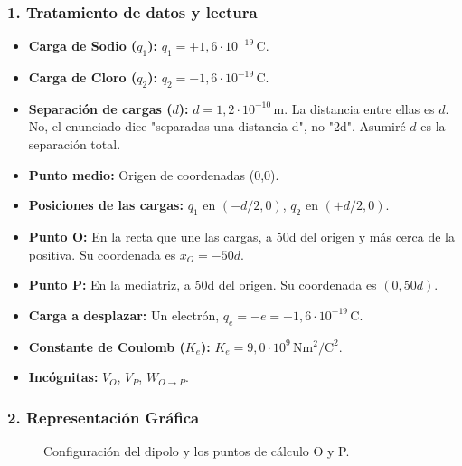 \subsubsection*{1. Tratamiento de datos y lectura}
\begin{itemize}
    \item \textbf{Carga de Sodio ($q_1$):} $q_1 = +1,6 \cdot 10^{-19} \, \text{C}$.
    \item \textbf{Carga de Cloro ($q_2$):} $q_2 = -1,6 \cdot 10^{-19} \, \text{C}$.
    \item \textbf{Separación de cargas ($d$):} $d = 1,2 \cdot 10^{-10} \, \text{m}$. La distancia entre ellas es $d$. No, el enunciado dice "separadas una distancia d", no "2d". Asumiré $d$ es la separación total.
    \item \textbf{Punto medio:} Origen de coordenadas (0,0).
    \item \textbf{Posiciones de las cargas:} $q_1$ en $(-d/2, 0)$, $q_2$ en $(+d/2, 0)$.
    \item \textbf{Punto O:} En la recta que une las cargas, a 50d del origen y más cerca de la positiva. Su coordenada es $x_O = -50d$.
    \item \textbf{Punto P:} En la mediatriz, a 50d del origen. Su coordenada es $(0, 50d)$.
    \item \textbf{Carga a desplazar:} Un electrón, $q_e = -e = -1,6 \cdot 10^{-19} \, \text{C}$.
    \item \textbf{Constante de Coulomb ($K_e$):} $K_e = 9,0 \cdot 10^9 \, \text{N}\text{m}^2/\text{C}^2$.
    \item \textbf{Incógnitas:} $V_O$, $V_P$, $W_{O \to P}$.
\end{itemize}

\subsubsection*{2. Representación Gráfica}
\begin{figure}[H]
    \centering
    \caption{Configuración del dipolo y los puntos de cálculo O y P.}
\end{figure}

